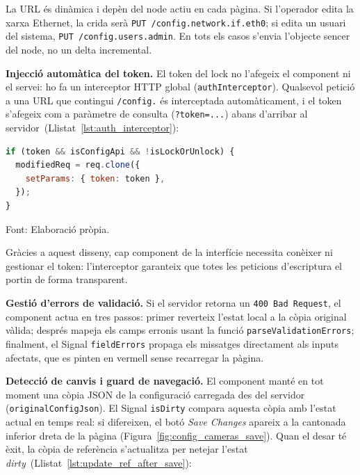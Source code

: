 \medskip
La URL és dinàmica i depèn del node actiu en cada pàgina. Si l'operador edita la xarxa Ethernet, la crida serà \texttt{PUT /config.\allowbreak{}network.\allowbreak{}if.\allowbreak{}eth0}; si edita un usuari del sistema, \texttt{PUT /config.\allowbreak{}users.\allowbreak{}admin}. En tots els casos s'envia l'objecte sencer del node, no un delta incremental.

\textbf{Injecció automàtica del token.} El token del lock no l'afegeix el component ni el servei: ho fa un interceptor HTTP global (\texttt{authInterceptor}). Qualsevol petició a una URL que contingui \texttt{/config.} és interceptada automàticament, i el token s'afegeix com a paràmetre de consulta (\texttt{?token=...}) abans d'arribar al servidor~(Llistat~\ref{lst:auth_interceptor}):

\begin{lstlisting}[basicstyle=\footnotesize, language=JavaScript, label={lst:auth_interceptor}, caption={Fragment de \texttt{authInterceptor}: injecci\'o transparent del token de lock a totes les peticions de configuraci\'o.}]
if (token && isConfigApi && !isLockOrUnlock) {
  modifiedReq = req.clone({
    setParams: { token: token },
  });
}
\end{lstlisting}
\smallskip\par{\small\noindent Font: Elaboració pròpia.}

\medskip
Gràcies a aquest disseny, cap component de la interfície necessita conèixer ni gestionar el token: l'interceptor garanteix que totes les peticions d'escriptura el portin de forma transparent.

\textbf{Gestió d'errors de validació.} Si el servidor retorna un \texttt{400 Bad Request}, el component actua en tres passos: primer reverteix l'estat local a la còpia original vàlida; després mapeja els camps erronis usant la funció \texttt{parseValidationErrors}; finalment, el Signal \texttt{fieldErrors} propaga els missatges directament als inputs afectats, que es pinten en vermell sense recarregar la pàgina.

\textbf{Detecció de canvis i guard de navegació.} El component manté en tot moment una còpia JSON de la configuració carregada des del servidor (\texttt{originalConfigJson}). El Signal \texttt{isDirty} compara aquesta còpia amb l'estat actual en temps real: si difereixen, el botó \textit{Save Changes} apareix a la cantonada inferior dreta de la pàgina (Figura~\ref{fig:config_cameras_save}). Quan el desar té èxit, la còpia de referència s'actualitza per netejar l'estat \textit{dirty}~(Llistat~\ref{lst:update_ref_after_save}):

